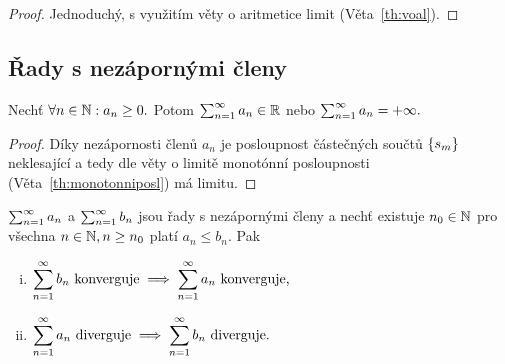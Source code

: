 \begin{proof}
    Jednoduchý, s využitím věty o aritmetice limit (Věta~\ref{th:voal}).
\end{proof}

\subsection{Řady s nezápornými členy}

\begin{observation}
    Nechť $\forall n \in \mathbb{N}: a_n \geq 0.$ Potom
    $\sum_{n=1}^\infty a_n \in \mathbb{R}$ nebo $\sum_{n=1}^\infty a_n = +\infty.$
\end{observation}
    
\begin{proof}
    Díky nezápornosti členů $a_n$ je posloupnost částečných součtů 
    $\left\{s_m\right\}$ neklesající a tedy dle věty o limitě 
    monotónní posloupnosti (Věta~\ref{th:monotonniposl}) má limitu.
\end{proof}

\begin{theorem}
    \label{th:srovnavacikrit}
    \Necht $\sum_{n=1}^\infty a_n$ a $\sum_{n=1}^\infty b_n$ jsou řady s nezápornými členy a nechť
    existuje $n_0 \in \mathbb{N}$ \tz pro všechna $n\in\mathbb{N},n\geq n_0$ platí $a_n \leq b_n.$
    Pak
    \begin{enumerate}[(i)]
        \item $\displaystyle \sum_{n=1}^\infty b_n \text{ konverguje} \implies \sum_{n=1}^\infty a_n \text{ konverguje,}$
        \item $\displaystyle \sum_{n=1}^\infty a_n \text{ diverguje} \implies \sum_{n=1}^\infty b_n \text{ diverguje.}$
    \end{enumerate}
\end{theorem}

